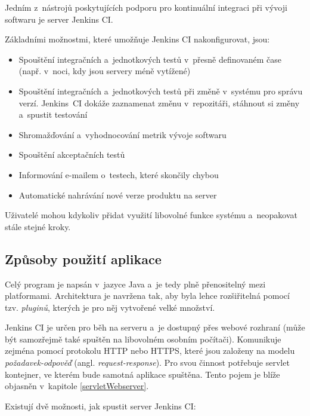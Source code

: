             Jedním z~nástrojů poskytujících podporu pro kontinuální integraci při vývoji softwaru je 
            server Jenkins CI. 
            
            \medskip \noindent Základními možnostmi, které umožňuje Jenkins CI nakonfigurovat, jsou:
            
            \begin{itemize}
                \item Spouštění integračních a~jednotkových testů v~přesně definovaném čase (např. v~noci, kdy jsou servery méně vytížené)
                \item Spouštění integračních a~jednotkových testů při změně v~systému pro správu verzí. Jenkins~CI dokáže zaznamenat změnu v~repozitáři,
                    stáhnout si změny a~spustit testování
                \item Shromažďování a~vyhodnocování metrik vývoje softwaru
                \item Spouštění akceptačních testů
                \item Informování e-mailem o~testech, které skončily chybou
                \item Automatické nahrávání nové verze produktu na server
            \end{itemize} 

            Uživatelé mohou kdykoliv přidat využití libovolné funkce systému a~neopakovat stále stejné kroky. 
            

        \subsection{Způsoby použití aplikace}
            Celý program je napsán v~jazyce Java a~je tedy plně přenositelný mezi platformami. Architektura je navržena tak, aby byla 
            lehce rozšiřitelná pomocí tzv. \emph{pluginů}, kterých je pro něj vytvořené velké množství. 
            
            Jenkins CI je určen pro běh na serveru a~je dostupný přes webové rozhraní (může být samozřejmě také spuštěn
            na libovolném osobním počítači). 
            Komunikuje zejména pomocí protokolu HTTP nebo HTTPS, 
            které jsou založeny na modelu \emph{požadavek-odpověď} (angl. \emph{request-response}).  
            Pro svou činnost potřebuje servlet kontejner, ve kterém bude samotná aplikace spuštěna.
            Tento pojem je blíže objasněn v~kapitole \ref{servletWebserver}.

            \medskip \noindent
            Existují dvě možnosti, jak spustit server Jenkins CI:

